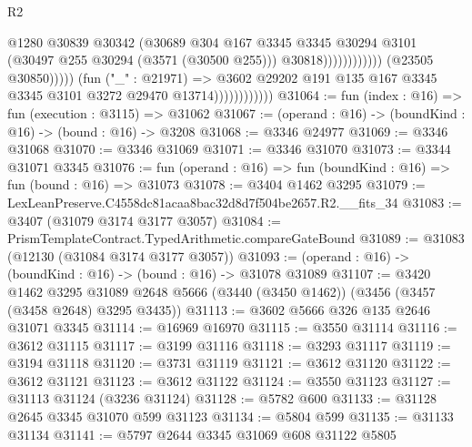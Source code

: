 \begin{lexlean}{R2}
\begin{coremodule}
                                                        @1280
                                                        @30839
                                                        @30342
                                                        (@30689
                                                          @304
                                                          @167
                                                          @3345
                                                          @3345
                                                          @30294
                                                          @3101
                                                          (@30497 @255 @30294 (@3571 (@30500 @255)))
                                                          @30818))))))))))))
                                  (@23505 @30850)))))
                          (fun ("_" : @21971) =>
                          @3602
                            @29202
                            @191
                            @135
                            @167
                            @3345
                            @3345
                            @3101
                            @3272
                            @29470
                            @13714))))))))))))
@31064 := fun (index : @16) => fun (execution : @3115) => @31062
@31067 := (operand : @16) -> (boundKind : @16) -> (bound : @16) -> @3208
@31068 := @3346 @24977
@31069 := @3346 @31068
@31070 := @3346 @31069
@31071 := @3346 @31070
@31073 := @3344 @31071 @3345
@31076 := fun (operand : @16) => fun (boundKind : @16) => fun (bound : @16) => @31073
@31078 := @3404 @1462 @3295
@31079 := LexLeanPreserve.C4558dc81acaa8bac32d8d7f504be2657.R2.__fits_34
@31083 := @3407 (@31079 @3174 @3177 @3057)
@31084 := PrismTemplateContract.TypedArithmetic.compareGateBound
@31089 := @31083 (@12130 (@31084 @3174 @3177 @3057))
@31093 := (operand : @16) -> (boundKind : @16) -> (bound : @16) -> @31078 @31089
@31107 := @3420
    @1462
    @3295
    @31089
    @2648
    @5666
    (@3440 (@3450 @1462))
    (@3456 (@3457 (@3458 @2648) @3295 @3435))
@31113 := @3602 @5666 @326 @135 @2646 @31071 @3345
@31114 := @16969 @16970
@31115 := @3550 @31114
@31116 := @3612 @31115
@31117 := @3199 @31116
@31118 := @3293 @31117
@31119 := @3194 @31118
@31120 := @3731 @31119
@31121 := @3612 @31120
@31122 := @3612 @31121
@31123 := @3612 @31122
@31124 := @3550 @31123
@31127 := @31113 @31124 (@3236 @31124)
@31128 := @5782 @600
@31133 := @31128 @2645 @3345 @31070 @599 @31123
@31134 := @5804 @599
@31135 := @31133 @31134
@31141 := @5797 @2644 @3345 @31069 @608 @31122 @5805

\end{coremodule}
\end{lexlean}
